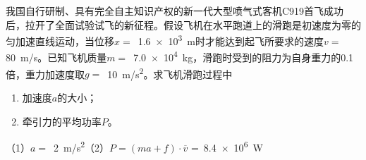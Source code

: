 我国自行研制、具有完全自主知识产权的新一代大型喷气式客机C919首飞成功后，拉开了全面试验试飞的新征程。假设飞机在水平跑道上的滑跑是初速度为零的匀加速直线运动，当位移\(x =\) \,\qty{1.6e3}{m}时才能达到起飞所要求的速度\(v =\) \,\qty{80}{m/s}。已知飞机质量\(m =\) \,\qty{7.0e4}{kg}，滑跑时受到的阻力为自身重力的0.1倍，重力加速度取\(g =\) \,\qty{10}{m/s^2}。求飞机滑跑过程中
\begin{enumerate}
    \item 加速度\(a\)的大小；
    \item 牵引力的平均功率\(P\)。
\end{enumerate}
\begin{answer}
    （1）\(a =\) \,\qty{2}{m/s^2}（2）\(P = (ma + f)\cdot\overline{v}\) = \,\qty{8.4e6}{W}
\end{answer}